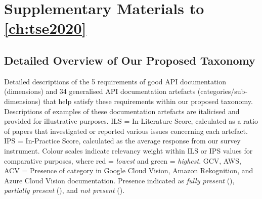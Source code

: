 \chapter{Supplementary Materials to \cref{ch:tse2020}}
\label{ch:tse-supplementary-materials}
\cleardoublepage

\def\circlenotpresent{\faCircleO}
\def\circlepartialpresent{\faAdjust}
\def\circlepresent{\faCircle}

\section{Detailed Overview of Our Proposed Taxonomy}
\label{tse2020:tab:taxonomy}

Detailed descriptions of the 5 requirements of good API documentation (dimensions) and 34 generalised API documentation artefacts (categories/sub-dimensions) that help satisfy these requirements within our proposed taxonomy. Descriptions of examples of these documentation artefacts are italicised and provided for illustrative purposes. ILS = In-Literature Score, calculated as a ratio of papers that investigated or reported various issues concerning each artefact. IPS = In-Practice Score, calculated as the average response from our survey instrument. Colour scales indicate relevancy weight within ILS or IPS values for comparative purposes, where red = \textit{lowest} and green = \textit{highest}. GCV, AWS, ACV = Presence of category in Google Cloud Vision, Amazon Rekognition, and Azure Cloud Vision documentation. Presence indicated as \textit{fully present} (\circlepresent{}), \textit{partially present} (\circlepartialpresent{}), and \textit{not present} (\circlenotpresent{}).

